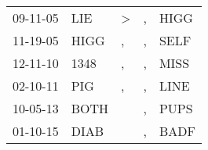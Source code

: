 \begin{supertabular}{p{0.07\textwidth}p{0.06\textwidth}p{0.02\textwidth}p{0.02\textwidth}p{0.06\textwidth}}
 09-11-05\textsuperscript{} &   LIE\textsuperscript{} &  \textgreater &  , &  HIGG\textsuperscript{} \\
 11-19-05\textsuperscript{} &  HIGG\textsuperscript{} &             , &  , &  SELF\textsuperscript{} \\
 12-11-10\textsuperscript{} &  1348\textsuperscript{} &             , &  , &  MISS\textsuperscript{} \\
 02-10-11\textsuperscript{} &   PIG\textsuperscript{} &             , &  , &  LINE\textsuperscript{} \\
 10-05-13\textsuperscript{} &  BOTH\textsuperscript{} &               &  , &  PUPS\textsuperscript{} \\
 01-10-15\textsuperscript{} &  DIAB\textsuperscript{} &               &  , &  BADF\textsuperscript{} \\
\end{supertabular}
